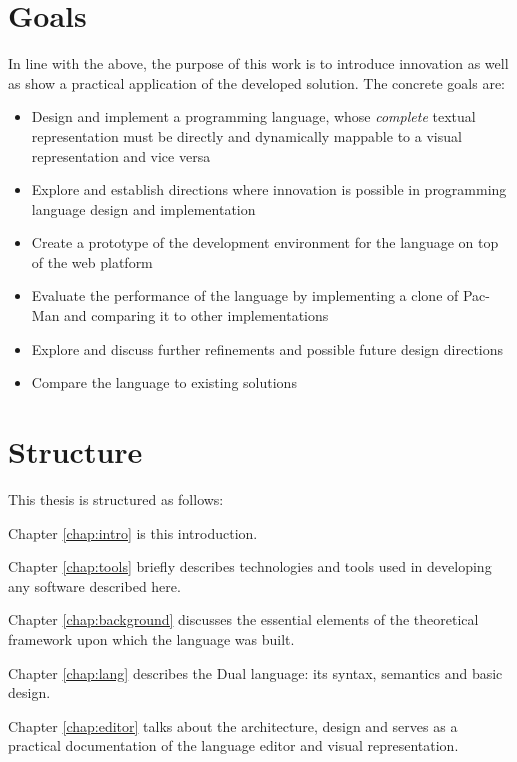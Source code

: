 \section{Goals}
In line with the above, the purpose of this work is to introduce innovation as well as show a practical application of the developed solution. The concrete goals are:
\begin{itemize}
	\item Design and implement a programming language, whose \textit{complete} textual representation must be directly and dynamically mappable to a visual representation and vice versa
	\item Explore and establish directions where innovation is possible in programming language design and implementation
	\item Create a prototype of the development environment for the language on top of the web platform
	\item Evaluate the performance of the language by implementing a clone of Pac-Man and comparing it to other implementations
	\item Explore and discuss further refinements and possible future design directions
	\item Compare the language to existing solutions %
\end{itemize}

\section{Structure}
This thesis is structured as follows:

Chapter \ref{chap:intro} is this introduction.

Chapter \ref{chap:tools} briefly describes technologies and tools used in developing any software described here.

Chapter \ref{chap:background} discusses the essential elements of the theoretical framework upon which the language was built.

Chapter \ref{chap:lang} describes the Dual language: its syntax, semantics and basic design.

Chapter \ref{chap:editor} talks about the architecture, design and serves as a practical documentation of the language editor and visual representation.

